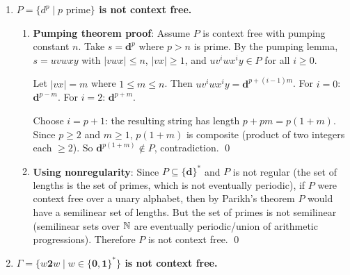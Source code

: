 \begin{enumerate}[{9.}1. ]
\textbf{Lemma}: If $G = \langle\Omega,\Sigma,S,P\rangle$, $X \to \gamma B\alpha \in P$, all $B$-rules are $\{B \to \beta_i\}$, and $G'$ replaces $X \to \gamma B\alpha$ with $\{X_B \to \gamma\beta_i\alpha\}$, then $L(G) = L(G')$.

\textbf{Proof}: By induction on derivation length.

($L(G) \subseteq L(G')$): Any derivation in $G$ that uses $X \to \gamma B\alpha$ followed later by $B \to \beta_i$ can be replaced in $G'$ by the single production $X_B \to \gamma\beta_i\alpha$. All other derivations are unchanged.

($L(G') \subseteq L(G)$): Any production $X_B \to \gamma\beta_i\alpha$ in $G'$ can be simulated in $G$ by $X \to \gamma B\alpha$ followed by $B \to \beta_i$. \qed

\item \textbf{$P = \{d^p \mid p \text{ prime}\}$ is not context free.}

\begin{enumerate}
\item \textbf{Pumping theorem proof}: Assume $P$ is context free with pumping constant $n$. Take $s = \pmb{d}^p$ where $p > n$ is prime. By the pumping lemma, $s = uvwxy$ with $|vwx| \leq n$, $|vx| \geq 1$, and $uv^i wx^i y \in P$ for all $i \geq 0$.

Let $|vx| = m$ where $1 \leq m \leq n$. Then $uv^i wx^i y = \pmb{d}^{p + (i-1)m}$. For $i=0$: $\pmb{d}^{p-m}$. For $i=2$: $\pmb{d}^{p+m}$.

Choose $i = p+1$: the resulting string has length $p + pm = p(1+m)$. Since $p \geq 2$ and $m \geq 1$, $p(1+m)$ is composite (product of two integers each $\geq 2$). So $\pmb{d}^{p(1+m)} \notin P$, contradiction. \qed

\item \textbf{Using nonregularity}: Since $P \subseteq \{\pmb{d}\}^*$ and $P$ is not regular (the set of lengths is the set of primes, which is not eventually periodic), if $P$ were context free over a unary alphabet, then by Parikh's theorem $P$ would have a semilinear set of lengths. But the set of primes is not semilinear (semilinear sets over $\mathbb{N}$ are eventually periodic/union of arithmetic progressions). Therefore $P$ is not context free. \qed
\end{enumerate}

\item \textbf{$\Gamma = \{w\pmb{2}w \mid w \in \{\pmb{0},\pmb{1}\}^*\}$ is not context free.}


\end{enumerate}

